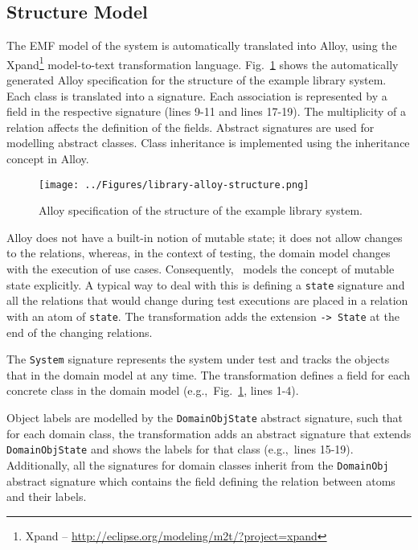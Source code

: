
\subsection{Structure Model}
\label{sec:alloy-structure}
The EMF model of the system is automatically translated into Alloy, using the Xpand\footnote{Xpand – \url{http://eclipse.org/modeling/m2t/?project=xpand}} model-to-text transformation language. Fig.~\ref{fig:library-alloy-structure} shows the automatically generated Alloy specification for the structure of the example library system. Each class is translated into a signature. Each association is represented by a field in the respective signature (lines 9-11 and lines 17-19). The multiplicity of a relation affects the definition of the fields. Abstract signatures are used for modelling abstract classes. Class inheritance is implemented using the inheritance concept in Alloy.

\begin{figure}[h]
\centering
\texttt{[image: ../Figures/library-alloy-structure.png]}
\caption{Alloy specification of the structure of the example library system.}
\label{fig:library-alloy-structure}
\end{figure}

Alloy does not have a built-in notion of mutable state; it does not allow changes to the relations, whereas, in the context of testing, the domain model changes with the execution of use cases. Consequently, \this~models the concept of mutable state explicitly. A typical way to deal with this is defining a \texttt{state} signature and all the relations that would change during test executions are placed in a relation with an atom of \texttt{state}. The transformation adds the extension \texttt{-> State} at the end of the changing relations.

The \texttt{System} signature represents the system under test and tracks the objects that in the domain model at any time. The transformation defines a field for each concrete class in the domain model (e.g.,\ Fig.~\ref{fig:library-alloy-structure}, lines 1-4).

Object labels are modelled by the \texttt{DomainObjState} abstract signature, such that for each domain class, the transformation adds an abstract signature that extends \texttt{DomainObjState} and shows the labels for that class (e.g.,\ lines 15-19). Additionally, all the signatures for domain classes inherit from the \texttt{DomainObj} abstract signature which contains the field defining the relation between atoms and their labels.

